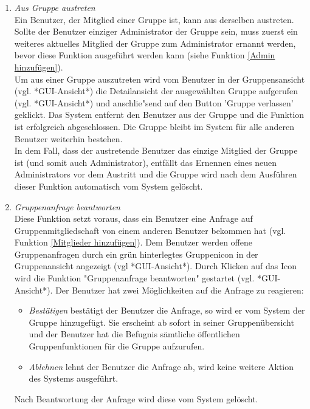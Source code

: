 \documentclass[parskip=full]{scrartcl}
\def\threedigits#1{%
  \ifnum#1<100 0\fi
  \ifnum#1<10 0\fi
  \number#1}
\begin{document}
\begin{enumerate}[label={\textbf{/F\protect\threedigits{\theenumi}0/}}, leftmargin=*, resume]
	
	\item \textit{Aus Gruppe austreten}\label{aus Gruppe austreten}\\
	Ein \gls{Benutzer}, der Mitglied einer Gruppe ist, kann aus derselben austreten. Sollte der Benutzer einziger Administrator der Gruppe sein, muss zuerst ein weiteres aktuelles Mitglied der Gruppe zum Administrator ernannt werden, bevor diese Funktion ausgeführt werden kann (siehe Funktion \ref{Admin hinzufügen}). \\
	Um aus einer Gruppe auszutreten wird vom Benutzer in der Gruppensansicht (vgl. *GUI-Ansicht*) die Detailansicht der ausgewählten Gruppe aufgerufen (vgl. *GUI-Ansicht*) und anschlie"send auf den Button 'Gruppe verlassen' geklickt. Das System entfernt den Benutzer aus der Gruppe und die Funktion ist erfolgreich abgeschlossen. Die Gruppe bleibt im System für alle anderen Benutzer weiterhin bestehen.\\
	In dem Fall, dass der austretende Benutzer das einzige Mitglied der Gruppe ist (und somit auch Administrator), entfällt das Ernennen eines neuen Administrators vor dem Austritt und die Gruppe wird nach dem Ausführen dieser Funktion automatisch vom System gelöscht.
	
	\item \textit{Gruppenanfrage beantworten}\label{Gruppenanfrage beantworten} \\
	Diese Funktion setzt voraus, dass ein Benutzer eine Anfrage auf Gruppenmitgliedschaft von einem anderen Benutzer bekommen hat (vgl. Funktion \ref{Mitglieder hinzufügen}). Dem Benutzer werden offene Gruppenanfragen durch ein grün hinterlegtes Gruppenicon in der Gruppenansicht angezeigt (vgl *GUI-Ansicht*). Durch Klicken auf das Icon wird die Funktion "Gruppenanfrage beantworten" gestartet (vgl. *GUI-Ansicht*). Der Benutzer hat zwei Möglichkeiten auf die Anfrage zu reagieren:
	\begin{itemize}
		\item \textit{Bestätigen} bestätigt der Benutzer die Anfrage, so wird er vom System der Gruppe hinzugefügt. Sie erscheint ab sofort in seiner Gruppenübersicht und der Benutzer hat die Befugnis sämtliche öffentlichen Gruppenfunktionen für die Gruppe aufzurufen.
		\item \textit{Ablehnen} lehnt der Benutzer die Anfrage ab, wird keine weitere Aktion des Systems ausgeführt.
	\end{itemize}
Nach Beantwortung der Anfrage wird diese vom System gelöscht.
\end{enumerate}
\end{document}
